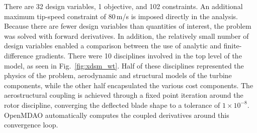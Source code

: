 \documentclass[]{aiaa-tc} %
\begin{document}
    There are 32 design variables, 1 objective, and 102 constraints. An additional maximum tip-speed constraint of
    80\,m/s is imposed directly in the analysis.  Because there are
    fewer design variables than quantities of interest, the problem was solved with
    forward derivatives. In addition, the relatively small number of design variables
    enabled a comparison between the use of analytic and finite-difference gradients. There were 10 disciplines
    involved in the top level of the model, as seen in Fig.~\ref{fig:xdsm_wt}.  Half of these disciplines represented the physics of the problem, aerodynamic and structural models of the turbine components, while the other half encapsulated the various cost components.  The aerostructural coupling is achieved through a fixed point iteration around the rotor discipline, converging the deflected blade shape to a tolerance of $1\times10^{-8}$. OpenMDAO automatically computes the coupled derivatives around this convergence loop.
\end{document}
